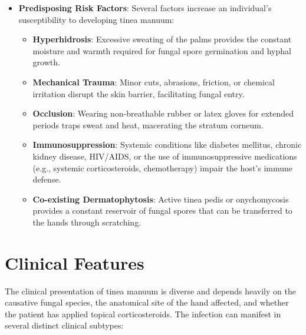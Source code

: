 \begin{itemize}
    \item \textbf{Predisposing Risk Factors}: Several factors increase an individual's susceptibility to developing tinea manuum:
    \begin{itemize}
        \item \textbf{Hyperhidrosis}: Excessive sweating of the palms provides the constant moisture and warmth required for fungal spore germination and hyphal growth.
        \item \textbf{Mechanical Trauma}: Minor cuts, abrasions, friction, or chemical irritation disrupt the skin barrier, facilitating fungal entry.
        \item \textbf{Occlusion}: Wearing non-breathable rubber or latex gloves for extended periods traps sweat and heat, macerating the stratum corneum.
        \item \textbf{Immunosuppression}: Systemic conditions like diabetes mellitus, chronic kidney disease, HIV/AIDS, or the use of immunosuppressive medications (e.g., systemic corticosteroids, chemotherapy) impair the host's immune defense.
        \item \textbf{Co-existing Dermatophytosis}: Active tinea pedis or onychomycosis provides a constant reservoir of fungal spores that can be transferred to the hands through scratching.
    \end{itemize}
\end{itemize}

\section*{Clinical Features}
The clinical presentation of tinea manuum is diverse and depends heavily on the causative fungal species, the anatomical site of the hand affected, and whether the patient has applied topical corticosteroids. The infection can manifest in several distinct clinical subtypes:

